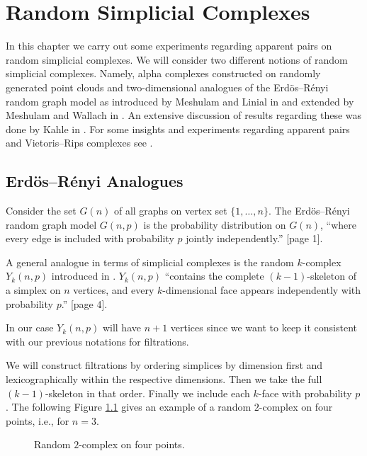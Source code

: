 \chapter{Random Simplicial Complexes}
\label{ch:random}
In this chapter we carry out some experiments regarding apparent pairs on random simplicial complexes. We will consider two different notions of random simplicial complexes. Namely, alpha complexes constructed on randomly generated point clouds and two-dimensional analogues of the Erdös--Rényi random graph model as introduced by Meshulam and Linial in \cite{LinialMeshulam} and extended by Meshulam and Wallach in \cite{Meshulam_Wallach_2009}. An extensive discussion of results regarding these was done by Kahle in \cite{kahle2016random}. For some insights and experiments regarding apparent pairs and Vietoris--Rips complexes see \cite{bauer2019ripser}.

\section{Erdös--Rényi Analogues}
Consider the set $G(n)$ of all graphs on vertex set $\{1,\dots,n\}$. The Erdös--Rényi random graph model $G(n,p)$ is the probability distribution on $G(n)$, \enquote{where every edge is included with probability $p$ jointly independently.} \cite{kahle2016random}[page 1].

A general analogue in terms of simplicial complexes is the random $k$-complex $Y_k(n,p)$ introduced in \cite{Meshulam_Wallach_2009}. $Y_k(n,p)$ \enquote{contains the complete $(k-1)$-skeleton of a simplex on $n$ vertices, and every $k$-dimensional face appears independently with probability $p$.} \cite{kahle2016random}[page 4].

In our case $Y_k(n,p)$ will have $n+1$ vertices since we want to keep it consistent with our previous notations for filtrations.

We will construct filtrations by ordering simplices by dimension first and lexicographically within the respective dimensions. Then we take the full $(k-1)$-skeleton in that order. Finally we include each $k$-face with probability $p$. 
The following Figure \ref{fig:randomk} gives an example of a random $2$-complex on four points, i.e., for $n=3$.

\begin{figure}[H]
\begin{subfigure}[b]{0.99\textwidth}
\begin{center}

\end{center}
\end{subfigure}
\caption{Random $2$-complex on four points.}
\label{fig:randomk}
\end{figure}

